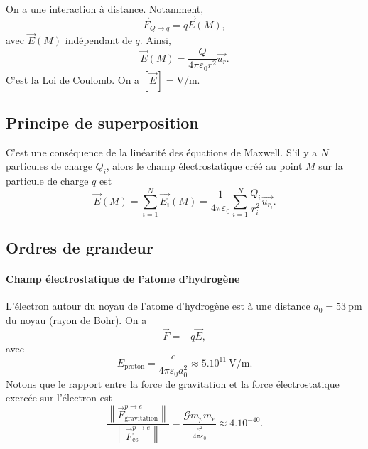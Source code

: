             On a une interaction à distance. Notamment,
            \begin{equation*}
                \vec{F}_{Q\to q}=q\vec{E}(M),
            \end{equation*}
            avec $\vec{E}(M)$ indépendant de $q$. Ainsi,
            \begin{equation*}
                \boxed{
                    \vec{E}(M)=\frac{Q}{4\pi\varepsilon_{0}r^{2}}\vec{u_r}.
                }
            \end{equation*}
            C'est la Loi de Coulomb. On a $[\vec{E}]=\si{\volt\per\metre}$.

    \subsection{Principe de superposition}

        C'est une conséquence de la linéarité des équations de Maxwell. S'il y a $N$ particules de charge $Q_i$, alors le champ électrostatique créé au point $M$ sur la particule de charge $q$ est 
        \begin{equation*}
            \boxed{
                \vec{E}(M)=\sum_{i=1}^{N}\vec{E_i}(M)=\frac{1}{4\pi\varepsilon_{0}}\sum_{i=1}^{N}\frac{Q_i}{r_i^{2}}\vec{u_{r_i}}.
            }
        \end{equation*}

    \subsection{Ordres de grandeur}

        \paragraph{Champ électrostatique de l'atome d'hydrogène}

            L'électron autour du noyau de l'atome d'hydrogène est à une distance $a_0=53~\si{\pico\metre}$ du noyau (rayon de Bohr). On a 
            \begin{equation*}
                \vec{F}=-q\vec{E},
            \end{equation*}
            avec
            \begin{equation*}
                E_{\text{proton}}=\frac{e}{4\pi\varepsilon_{0}a_{0}^{2}}\approx5.10^{11}~\si{\volt\per\metre}.
            \end{equation*}
            Notons que le rapport entre la force de gravitation et la force électrostatique exercée sur l'électron est 
            \begin{equation*}
                \frac{\left\lVert\vec{F}_{\text{gravitation}}^{p\to e}\right\rVert}{\left\lVert\vec{F}_{\text{es}}^{p\to e}\right\rVert}=\frac{\mathcal{G}m_p m_e}{\frac{e^{2}}{4\pi\varepsilon_{0}}}\approx 4.10^{-40}.
            \end{equation*}

